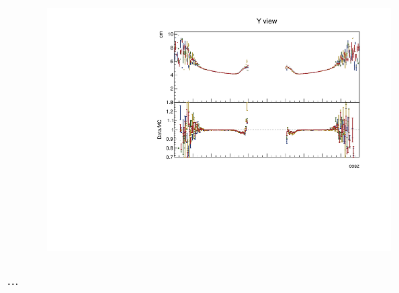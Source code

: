 \documentclass[12pt,a4paper]{article}
\begin{document}
\begin{figure}[!ht]
\begin{subfigure}{0.5\textwidth}
  \end{subfigure}
  \begin{subfigure}{0.5\textwidth}
    \includegraphics[width=\linewidth]{PlotsAngularDistribution/cm_cosz_y.pdf}
  \end{subfigure}
  \caption{...}
  \label{figAbsCalibCosZ2}
\end{figure}

\end{document}
